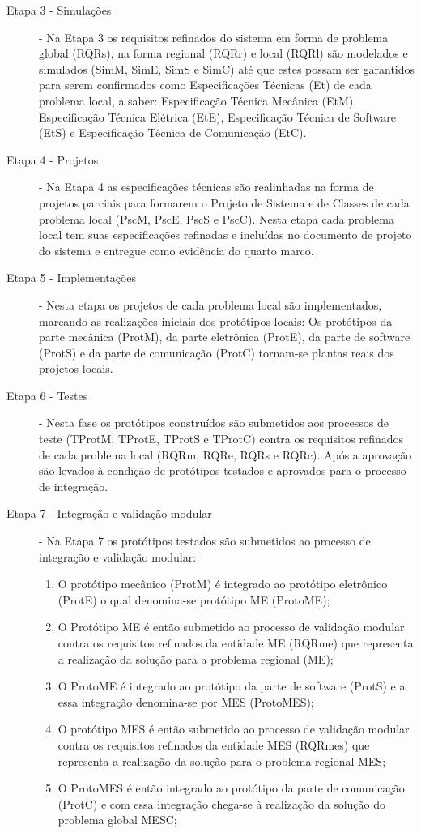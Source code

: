 \begin{description}
 	
  \item[Etapa 3 - Simulações] - Na Etapa 3 os requisitos refinados do sistema em forma de problema global (RQRs), na forma regional  (RQRr) e local (RQRl) são modelados e simulados (SimM, SimE, SimS e SimC) até que estes possam ser garantidos para serem confirmados como Especificações Técnicas (Et) de cada problema local, a saber: Especificação Técnica Mecânica (EtM), Especificação Técnica Elétrica (EtE), Especificação Técnica de Software (EtS) e Especificação Técnica de Comunicação (EtC). 
  
  
  \item[Etapa 4 - Projetos] - Na Etapa 4 as especificações técnicas são realinhadas na forma de projetos parciais para formarem o Projeto de Sistema e de Classes de cada problema local (PscM, PscE, PscS e PscC). Nesta etapa cada problema local tem suas especificações refinadas e incluídas no documento de projeto do sistema e entregue como evidência do quarto marco.  
  
  
  \item[Etapa 5 - Implementações] -  Nesta etapa os projetos de cada problema local são implementados, marcando as realizações iniciais dos protótipos locais: Os protótipos da parte mecânica (ProtM), da parte eletrônica (ProtE), da parte de software (ProtS) e da parte de comunicação (ProtC) tornam-se plantas reais dos projetos locais. 
  
  
  \item[Etapa 6 - Testes] - Nesta fase os protótipos construídos são submetidos aos processos de teste (TProtM, TProtE, TProtS e TProtC) contra os requisitos refinados de cada problema local (RQRm, RQRe, RQRs e RQRc). Após a aprovação são levados à condição de protótipos testados e aprovados para o processo de integração.
  
  \item[Etapa 7 - Integração e validação modular] -  Na Etapa 7 os protótipos testados são submetidos ao processo de integração e validação modular:
  
  \begin{enumerate}
  	
  	\item O protótipo mecânico (ProtM) é integrado ao protótipo eletrônico (ProtE) o qual denomina-se protótipo ME (ProtoME);
  	\item O Protótipo ME é então submetido ao processo de validação modular contra os requisitos refinados da entidade ME (RQRme) que representa a realização da solução para a problema regional (ME);
  	\item O ProtoME é integrado ao protótipo da parte de software (ProtS) e a essa integração denomina-se por MES (ProtoMES);
  	\item O protótipo MES é então submetido ao processo de validação modular contra os requisitos refinados da entidade MES (RQRmes) que representa a realização da solução para o problema regional MES;
  	\item O ProtoMES é então integrado ao protótipo da parte de comunicação (ProtC) e com essa integração chega-se à realização da solução do problema global MESC;
  	

\end{enumerate}
\end{description}

